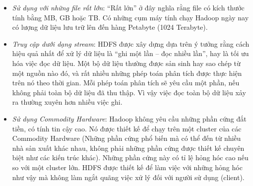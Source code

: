 \documentclass[12pt]{report}
\begin{document}
\begin{itemize}
\item \textit{Sử dụng với những file rất lớn}: “Rất lớn” ở đây nghĩa rằng file có kích thước tính bằng MB, GB hoặc TB. Có những cụm máy tính chạy Hadoop ngày nay có lượng dữ liệu lưu trữ lên đến hàng Petabyte (1024 Terabyte).

\item \textit{Truy cập dưới dạng stream}: HDFS được xây dựng dựa trên ý tưởng rằng cách hiệu quả nhất để xử lý dữ liệu là “ghi một lần – đọc nhiều lần”, hay là tối ưu hóa việc đọc dữ liệu. Một bộ dữ liệu thường được sản sinh hay sao chép từ một nguồn nào đó, và rất nhiều những phép toán phân tích được thực hiện trên nó theo thời gian. Mỗi phép toán phân tích sẽ yêu cầu một phần, nếu không phải toàn bộ dữ liệu đã thu thập. Vì vậy việc đọc toàn bộ dữ liệu xảy ra thường xuyên hơn nhiều việc ghi.

\item \textit{Sử dụng Commodity Hardware}: Hadoop không yêu cầu những phần cứng đắt tiền, có tính tin cậy cao. Nó được thiết kế để chạy trên một cluster của các Commodity Hardware (Những phần cứng phổ biến mà có thể đến từ nhiều nhà sản xuất khác nhau, không phải những phần cứng được thiết kế chuyên biệt như các kiến trúc khác). Những phần cứng này có tỉ lệ hỏng hóc cao nếu so với một cluster lớn. HDFS được thiết kế để làm việc với những hỏng hóc như vậy mà không làm ngắt quãng việc xử lý đối với người sử dụng (client). 
\end{itemize}
\end{document}
